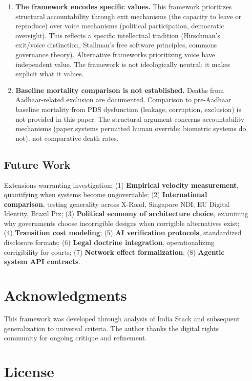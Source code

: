 \documentclass{article}
\begin{document}
\begin{enumerate}
    \item \textbf{The framework encodes specific values.} This framework prioritizes structural accountability through exit mechanisms (the capacity to leave or reproduce) over voice mechanisms (political participation, democratic oversight). This reflects a specific intellectual tradition (Hirschman's exit/voice distinction, Stallman's free software principles, commons governance theory). Alternative frameworks prioritizing voice have independent value. The framework is not ideologically neutral; it makes explicit what it values.

    \item \textbf{Baseline mortality comparison is not established.} Deaths from Aadhaar-related exclusion are documented. Comparison to pre-Aadhaar baseline mortality from PDS dysfunction (leakage, corruption, exclusion) is not provided in this paper. The structural argument concerns accountability mechanisms (paper systems permitted human override; biometric systems do not), not comparative death rates.
\end{enumerate}

\subsection{Future Work}

Extensions warranting investigation: (1) \textbf{Empirical velocity measurement}, quantifying when systems become ungovernable; (2) \textbf{International comparison}, testing generality across X-Road, Singapore NDI, EU Digital Identity, Brazil Pix; (3) \textbf{Political economy of architecture choice}, examining why governments choose incorrigible designs when corrigible alternatives exist; (4) \textbf{Transition cost modeling}; (5) \textbf{AI verification protocols}, standardized disclosure formats; (6) \textbf{Legal doctrine integration}, operationalizing corrigibility for courts; (7) \textbf{Network effect formalization}; (8) \textbf{Agentic system API contracts}.

\section*{Acknowledgments}

This framework was developed through analysis of India Stack and subsequent generalization to universal criteria. The author thanks the digital rights community for ongoing critique and refinement.

\section*{License}
\end{document}
